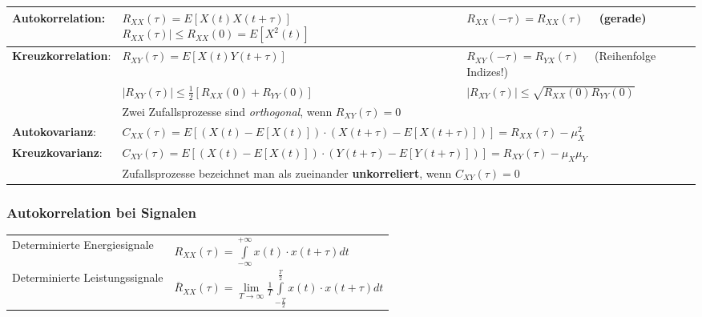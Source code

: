 \renewcommand{\arraystretch}{1.6}
\begin{tabular}[c]{|p{4cm}|p{6cm}|p{7.5cm}|}
	\hline
	\textbf{Autokorrelation}: 	&
		$R_{XX}(\tau) = E[X(t)X(t+\tau)]$\newline
  		$R_{XX}(\tau) \! \mid \leq R_{XX}(0) = E[X^{2}(t)]$ 
		&$R_{XX}(-\tau) = R_{XX}(\tau) \quad$ (gerade)\\
	\hline
  	\textbf{Kreuzkorrelation}: 	& 	
 		$R_{XY}(\tau) = E[X(t)Y(t+\tau)]$  
		& $R_{XY}(-\tau) = R_{YX}(\tau) \quad$ (Reihenfolge Indizes!) \\
		& $|R_{XY}(\tau)| \leq \frac{1}{2} \left[ R_{XX}(0)+R_{YY}(0)\right] $
		& $|R_{XY}(\tau)|  \leq \sqrt{R_{XX}(0)R_{YY}(0)}$ \\
		& \multicolumn{2}{l|}{Zwei Zufallsprozesse sind \textit{orthogonal}, wenn $R_{XY}(\tau) = 0$}\\
	\hline
  	\textbf{Autokovarianz}: 	&  
		\multicolumn{2}{l|}{$C_{XX}(\tau) = E\!\left[ \left( X(t)      - E[X(t)]      \right) \cdot
    	\left( X(t+\tau) - E[X(t+\tau)] \right) \right] =
   		R_{XX}(\tau) - \mu^{2}_{X} $} \\
   	\hline
  	\textbf{Kreuzkovarianz}: 	& 	
   		\multicolumn{2}{l|}{$C_{XY}(\tau) = E\!\left[ \left( X(t)      - E[X(t)]      \right) \cdot
        \left( Y(t+\tau) - E[Y(t+\tau)] \right) \right] = R_{XY}(\tau) - \mu_{X}\mu_{Y} $}\\
  	  	& \multicolumn{2}{l|}{Zufallsprozesse bezeichnet man als zueinander \textbf{unkorreliert}, wenn $C_{XY}(\tau) =0$}\\
   	\hline
\end{tabular}
\renewcommand{\arraystretch}{1}

\subsubsection{Autokorrelation bei Signalen}
	\begin{tabular}[c]{ll}
		Determinierte Energiesignale 
		& $ R_{XX}(\tau) = \int\limits_{-\infty}^{+\infty} x(t) \cdot x(t+\tau) dt$ \\
		Determinierte Leistungssignale
		& $\overline{R}_{XX}(\tau) = \lim\limits_{T\rightarrow\infty}\frac{1}{T}\int\limits_{-\frac{T}{2}}^{\frac{T}{2}} x(t) \cdot x(t+\tau) dt$ \\
	\end{tabular}\\
	
